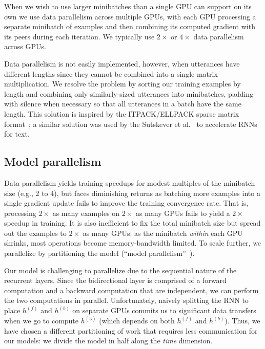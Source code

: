 \documentclass{article}
\begin{document}
When we wish to use larger minibatches than a single GPU can support on its own
we use data parallelism across multiple GPUs, with each GPU processing a
separate minibatch of examples and then combining its computed gradient with
its peers during each iteration.  We typically use $2\times$ or $4\times$ data
parallelism across GPUs.

Data parallelism is not easily implemented, however, when utterances have
different lengths since they cannot be combined into a single matrix
multiplication.  We resolve the problem by sorting our training examples by
length and combining only similarly-sized utterances into minibatches, padding
with silence when necessary so that all utterances in a batch have the same
length.  This solution is inspired by the ITPACK/ELLPACK sparse matrix
format~\cite{Kincaid:89};  a similar solution was used by the Sutskever et
al.~\cite{sutskever2014seq} to accelerate RNNs for text.

\subsection{Model parallelism}

Data parallelism yields training speedups for modest multiples of the minibatch
size (e.g., 2 to 4), but faces diminishing returns as batching more examples
into a single gradient update fails to improve the training convergence rate.
That is, processing $2\times$ as many examples on $2\times$ as many GPUs fails
to yield a $2\times$ speedup in training.  It is also inefficient to fix the
total minibatch size but spread out the examples to $2\times$ as many GPUs:  as
the minibatch \emph{within} each GPU shrinks, most operations become
memory-bandwidth limited.  To scale further, we parallelize by partitioning the
model (``model parallelism''~\cite{coates2013cotshpc,dean2012largescale}).

Our model is challenging to parallelize due to the sequential nature of the
recurrent layers.  Since the bidirectional layer is comprised of a forward
computation and a backward computation that are independent, we can perform the
two computations in parallel.  Unfortunately, naively splitting the RNN to
place $h^{(f)}$ and $h^{(b)}$ on separate GPUs commits us to significant data
transfers when we go to compute $h^{(5)}$ (which depends on both $h^{(f)}$ and
$h^{(b)}$).  Thus, we have chosen a different partitioning of work that
requires less communication for our models:  we divide the model in half along
the \emph{time} dimension.
\end{document}
